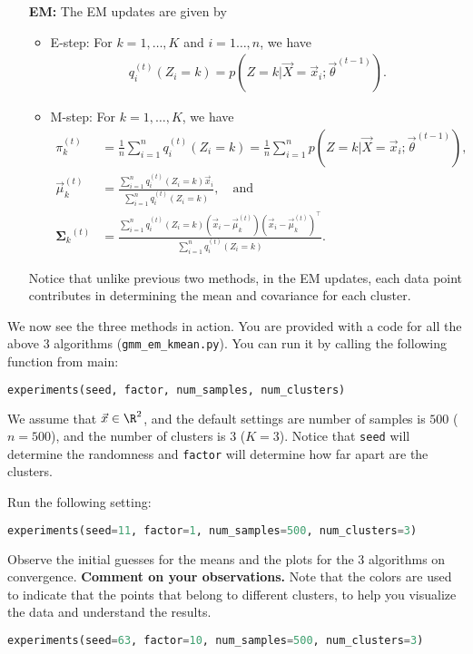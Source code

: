 \documentclass[preview]{standalone}
\begin{document}
\begin{itemize}
  \item[{\bf EM:}]  The EM updates are given by
  \begin{itemize}
    \item E-step: For $k = 1, \ldots, K$ and $i=1 \ldots, n$, we have
    \begin{align*}
      q_i^{(t)}(Z_i = k) = p(Z=k \vert \vec X = \vec x_i; \vec\theta^{(t-1)}).
    \end{align*}
    \item M-step: For $k = 1, \ldots, K$, we have
    \begin{align*}
      \pi_k^{(t)} &= \frac{1}{n}\sum_{i=1}^n q_i^{(t)}(Z_i = k) =
      \frac{1}{n}\sum_{i=1}^np(Z=k \vert \vec X = \vec x_i; \vec\theta^{(t-1)}),\\
      \vec\mu_k^{(t)} &= \frac{\sum_{i=1}^n q_i^{(t)}(Z_i = k) \vec x_i}{\sum_{i=1}^n q_i^{(t)}(Z_i = k)},\quad\text{and}\\
      {\bm \Sigma_k}^{(t)} &= \frac{\sum_{i=1}^n q_i^{(t)}(Z_i = k) (\vec x_i - \vec\mu_k^{(t)})
      (\vec x_i - \vec\mu_k^{(t)})^\top}{\sum_{i=1}^n q_i^{(t)}(Z_i = k)}.
    \end{align*}
  \end{itemize}
  Notice that unlike previous two methods, in the EM updates, each data point contributes
  in determining the mean and covariance for each cluster.

\end{itemize}

We now see the three methods in action.
You are provided with a code for all the above 3 algorithms ({\tt{gmm\_em\_kmean.py}}).
You can run it by calling the following function from main:
\begin{lstlisting}[language=Python]
experiments(seed, factor, num_samples, num_clusters)
\end{lstlisting}
We assume that $\vec x\in \R^2$, and the default settings are number of samples is
$500$ ($n=500$), and the number of clusters is $3$ ($K=3$). Notice that {\tt seed} will determine the
randomness and {\tt factor} will determine how far apart are the clusters.

\begin{Parts}

\Part Run the following setting:
\begin{lstlisting}[language=Python]
experiments(seed=11, factor=1, num_samples=500, num_clusters=3)
\end{lstlisting}
Observe the initial guesses for the means and the plots for the 3 algorithms on convergence.
{\bf Comment on your observations.}
Note that the colors are used to indicate that the points that belong to different clusters,
to help you visualize the data and understand the results.

\begin{lstlisting}[language=Python]
experiments(seed=63, factor=10, num_samples=500, num_clusters=3)
\end{lstlisting}

\end{Parts}
\end{document}
